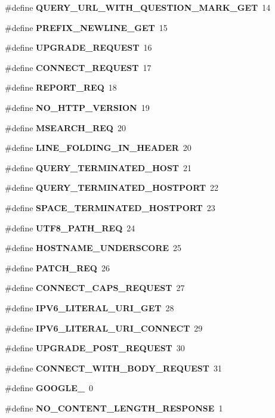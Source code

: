 \begin{DoxyCompactItemize}
\#define {\bf Q\+U\+E\+R\+Y\+\_\+\+U\+R\+L\+\_\+\+W\+I\+T\+H\+\_\+\+Q\+U\+E\+S\+T\+I\+O\+N\+\_\+\+M\+A\+R\+K\+\_\+\+G\+ET}~14
\item 
\#define {\bf P\+R\+E\+F\+I\+X\+\_\+\+N\+E\+W\+L\+I\+N\+E\+\_\+\+G\+ET}~15
\item 
\#define {\bf U\+P\+G\+R\+A\+D\+E\+\_\+\+R\+E\+Q\+U\+E\+ST}~16
\item 
\#define {\bf C\+O\+N\+N\+E\+C\+T\+\_\+\+R\+E\+Q\+U\+E\+ST}~17
\item 
\#define {\bf R\+E\+P\+O\+R\+T\+\_\+\+R\+EQ}~18
\item 
\#define {\bf N\+O\+\_\+\+H\+T\+T\+P\+\_\+\+V\+E\+R\+S\+I\+ON}~19
\item 
\#define {\bf M\+S\+E\+A\+R\+C\+H\+\_\+\+R\+EQ}~20
\item 
\#define {\bf L\+I\+N\+E\+\_\+\+F\+O\+L\+D\+I\+N\+G\+\_\+\+I\+N\+\_\+\+H\+E\+A\+D\+ER}~20
\item 
\#define {\bf Q\+U\+E\+R\+Y\+\_\+\+T\+E\+R\+M\+I\+N\+A\+T\+E\+D\+\_\+\+H\+O\+ST}~21
\item 
\#define {\bf Q\+U\+E\+R\+Y\+\_\+\+T\+E\+R\+M\+I\+N\+A\+T\+E\+D\+\_\+\+H\+O\+S\+T\+P\+O\+RT}~22
\item 
\#define {\bf S\+P\+A\+C\+E\+\_\+\+T\+E\+R\+M\+I\+N\+A\+T\+E\+D\+\_\+\+H\+O\+S\+T\+P\+O\+RT}~23
\item 
\#define {\bf U\+T\+F8\+\_\+\+P\+A\+T\+H\+\_\+\+R\+EQ}~24
\item 
\#define {\bf H\+O\+S\+T\+N\+A\+M\+E\+\_\+\+U\+N\+D\+E\+R\+S\+C\+O\+RE}~25
\item 
\#define {\bf P\+A\+T\+C\+H\+\_\+\+R\+EQ}~26
\item 
\#define {\bf C\+O\+N\+N\+E\+C\+T\+\_\+\+C\+A\+P\+S\+\_\+\+R\+E\+Q\+U\+E\+ST}~27
\item 
\#define {\bf I\+P\+V6\+\_\+\+L\+I\+T\+E\+R\+A\+L\+\_\+\+U\+R\+I\+\_\+\+G\+ET}~28
\item 
\#define {\bf I\+P\+V6\+\_\+\+L\+I\+T\+E\+R\+A\+L\+\_\+\+U\+R\+I\+\_\+\+C\+O\+N\+N\+E\+CT}~29
\item 
\#define {\bf U\+P\+G\+R\+A\+D\+E\+\_\+\+P\+O\+S\+T\+\_\+\+R\+E\+Q\+U\+E\+ST}~30
\item 
\#define {\bf C\+O\+N\+N\+E\+C\+T\+\_\+\+W\+I\+T\+H\+\_\+\+B\+O\+D\+Y\+\_\+\+R\+E\+Q\+U\+E\+ST}~31
\item 
\#define {\bf G\+O\+O\+G\+L\+E\+\_}~0
\item 
\#define {\bf N\+O\+\_\+\+C\+O\+N\+T\+E\+N\+T\+\_\+\+L\+E\+N\+G\+T\+H\+\_\+\+R\+E\+S\+P\+O\+N\+SE}~1
\item 

\end{DoxyCompactItemize}
